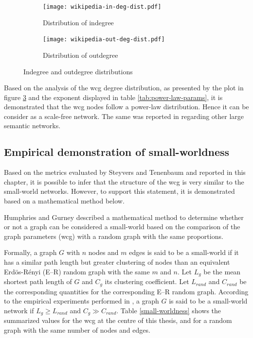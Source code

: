 \begin{figure}[!h]
\centering
\begin{subfigure}{0.49\textwidth}
\centering
\texttt{[image: wikipedia-in-deg-dist.pdf]}
\caption{Distribution of indegree}
\label{fig:left}
\end{subfigure}
\begin{subfigure}{0.49\textwidth}
\centering
\texttt{[image: wikipedia-out-deg-dist.pdf]}
\caption{Distribution of outdegree}
\label{fig:right}
\end{subfigure}
\caption{Indegree and outdegree distributions}
\label{fig:in-and-out-degree}
\end{figure}


Based on the analysis of the \gls{wcg} degree distribution, as presented by the plot in figure \ref{fig:in-and-out-degree} and the exponent displayed in table \ref{tab:power-law-params}, it is demonstrated that the \gls{wcg} nodes follow a power-law distribution. Hence it can be consider as a scale-free network. The same was reported in \cite{steyvers2005large} regarding other large semantic networks. 


\subsection{\hspace*{3pt} Empirical demonstration of small-worldness}

Based on the metrics evaluated by Steyvers and Tenenbaum \cite {steyvers2005large} and reported in this chapter, it is possible to infer that the structure of the \gls{wcg} is very similar to the  small-world networks. However, to support this statement, it is demonstrated based on a mathematical method below.  

Humphries and Gurney \cite{humphries2008network} described a mathematical method to determine whether or not a graph can be considered a small-world based on the comparison of the graph parameters (\gls {wcg}) with a random graph with the same proportions.

Formally, a graph $G$ with $n$ nodes and $m$ edges is said to be a small-world if it has a similar path length but greater clustering of nodes than an equivalent Erdös-Rényi (E–R) random graph with the same $m$ and $n$. Let $L_g$ be the mean shortest path length of $G$ and $C_g$ its clustering coefficient. Let $L_{rand}$ and  $C_{rand}$ be the corresponding quantities for the corresponding E–R random graph. According to the empirical experiments performed in \cite{humphries2008network}, a graph $G$ is said to be a small-world network if $L_g \ge L_{rand}$ and $ C_g \gg C_{rand}$. Table \ref{small-worldness} shows the summarized values for the \gls{wcg} at the centre of this thesis, and for a random graph with the same number of nodes and edges. 


